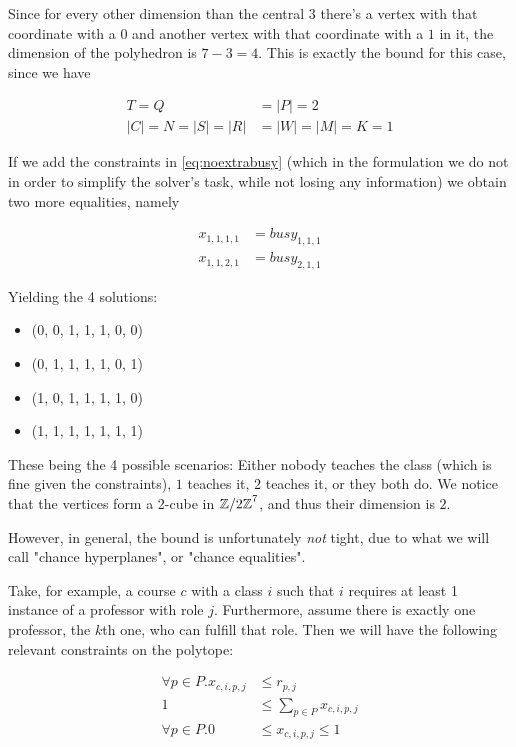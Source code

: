 Since for every other dimension than the central $3$ there's a vertex with that coordinate with a $0$ and another vertex with that coordinate with a $1$ in it, the dimension of the polyhedron is $7 - 3 = 4$. This is exactly the bound for this case, since we have

\begin{align*}
T = Q &= |P| = 2\\
|C| = N = |S| = |R| &= |W| = |M| = K = 1
\end{align*}

If we add the constraints in \ref{eq:noextrabusy} (which in the formulation we do not in order to simplify the solver's task, while not losing any information) we obtain two more equalities, namely

\begin{align*}
x_{1, 1, 1, 1} &= busy_{1, 1, 1}\\
x_{1, 1, 2, 1} &= busy_{2, 1, 1}
\end{align*}

Yielding the 4 solutions:

\begin{itemize}
\item (0, 0, 1, 1, 1, 0, 0)
\item (0, 1, 1, 1, 1, 0, 1)
\item (1, 0, 1, 1, 1, 1, 0)
\item (1, 1, 1, 1, 1, 1, 1)
\end{itemize}

These being the 4 possible scenarios: Either nobody teaches the class (which is fine given the constraints), $1$ teaches it, $2$ teaches it, or they both do. We notice that the vertices form a 2-cube in ${\mathbb{Z}/2\mathbb{Z}}^7$, and thus their dimension is $2$.

However, in general, the bound is unfortunately \emph{not} tight, due to what we will call "chance hyperplanes", or "chance equalities".

Take, for example, a course $c$ with a class $i$ such that $i$ requires at least 1 instance of a professor with role $j$. Furthermore, assume there is exactly one professor, the $k$th one, who can fulfill that role. Then we will have the following relevant constraints on the polytope:

\begin{align*}
\forall p \in P. x_{c, i, p, j} &\le r_{p, j}\\
1 &\le \sum_{p \in P} x_{c, i, p, j}\\
\forall p \in P. 0 &\le x_{c, i, p, j} \le 1
\end{align*}

